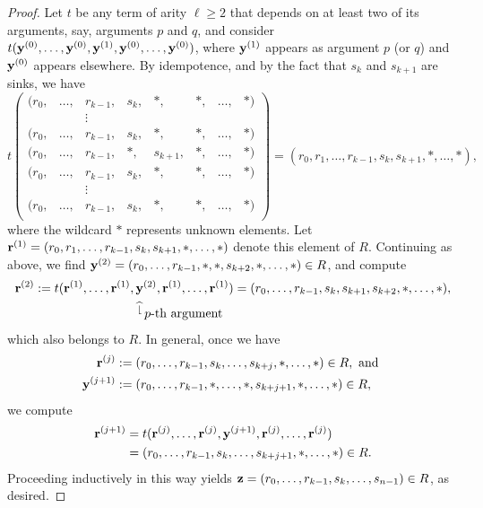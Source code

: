 {\begin{proof}
  Let $t$ be any term of arity $\ell\geq 2$ that depends on at least two of its 
  arguments, say, arguments $p$ and $q$, and 
  consider $t(\mathbf{y}^{(0)}, \dots, \mathbf{y}^{(0)},\mathbf{y}^{(1)}, \mathbf{y}^{(0)}, \dots, \mathbf{y}^{(0)})$, where 
  $\mathbf{y}^{(1)}$ appears as argument $p$ (or $q$) and $\mathbf{y}^{(0)}$ appears elsewhere.
  By idempotence, and by the fact that $s_k$ and $s_{k+1}$ are sinks, we have
  \[
  t\left( \begin{array}{cccccccc}
    (r_0,&\dots,&r_{k-1},&s_k,&\ast,&\ast,& \dots,&\ast)\\
      & & \vdots& &&\\
    (r_0,&\dots,&r_{k-1},&s_k,&\ast,&\ast,& \dots,&\ast)\\
    (r_0,& \dots,& r_{k-1},&\ast,&s_{k+1},&\ast,& \dots,& \ast)\\
    (r_0,&\dots,&r_{k-1},&s_k,&\ast,&\ast,& \dots,&\ast)\\
       & &\vdots & &&\\
    (r_0,&\dots,&r_{k-1},&s_k,&\ast,&\ast,& \dots,&\ast)\\
  \end{array}\right) = (r_0, r_1, \dots, r_{k-1}, s_k, s_{k+1}, \ast, \dots, \ast),
  \]
  where the wildcard $\ast$ represents unknown elements.
Let $\mathbf{r}^{(1)} = (r_0, r_1, \dots, r_{k-1}, s_k, s_{k+1}, \ast, \dots, \ast)$ 
denote this element of $R$.  
Continuing as above, we find 
$\mathbf{y}^{(2)} = (r_0, \dots, r_{k-1}, \ast, \ast, s_{k+2}, \ast, \dots, \ast) \in R$, 
and compute 
\begin{align*}
\mathbf{r}^{(2)}:= t(\mathbf{r}^{(1)}, \dots, \mathbf{r}^{(1)}, & \, \mathbf{y}^{(2)}, \mathbf{r}^{(1)}, \dots, \mathbf{r}^{(1)}) = 
(r_0, \dots, r_{k-1}, s_k, s_{k+1}, s_{k+2}, \ast, \dots, \ast),\\
&\; ^{\widehat{\lfloor}} \, \text{$p$-th argument}
\end{align*}
which also belongs to $R$.  In general, once we have 
\begin{align*}
\mathbf{r}^{(j)}&:= (r_0,  \dots, r_{k-1}, s_k, \dots, s_{k+j}, \ast, \dots, \ast) \in R, \text{ and }\\
\mathbf{y}^{(j+1)} &:= (r_0,  \dots, r_{k-1}, \ast, \dots, \ast, s_{k+j+1}, \ast, \dots, \ast) \in R,
\end{align*} 
we compute 
\begin{align*}
\mathbf{r}^{(j+1)} &= t(\mathbf{r}^{(j)},  \dots, \mathbf{r}^{(j)}, \mathbf{y}^{(j+1)}, \mathbf{r}^{(j)}, \dots, \mathbf{r}^{(j)}) \\
              & = (r_0,  \dots, r_{k-1}, s_k, \dots, s_{k+j+1}, \ast, \dots, \ast) \in R.  
\end{align*}
Proceeding inductively in this way yields $\mathbf{z} =
(r_0, \dots, r_{k-1}, s_k, \dots, s_{n-1}) \in R$, as desired.
\end{proof}

}{}








